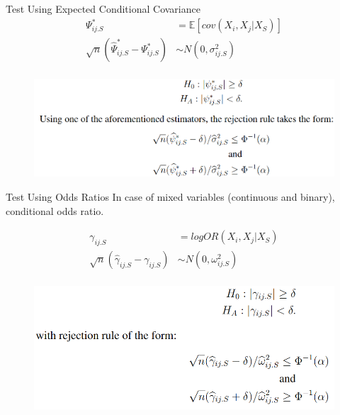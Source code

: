 \documentclass{beamer}
\begin{document}
\begin{frame}{Test Using Expected Conditional Covariance}
	\begin{equation*}
		\begin{split}
			\Psi^*_{ij.S} &= \mathbb{E}[cov(X_i, X_j | X_S)] \\
			\sqrt{n}(\hat{\Psi}^*_{ij.S} - \Psi^*_{ij.S}) & \sim N(0, \sigma^2_{ij.S}) \\
		\end{split}
	\end{equation*}
	\begin{figure}
		\centering
		\includegraphics[scale=0.3]{imgs/test2.png}
	\end{figure}
\end{frame}

\begin{frame}{Test Using Odds Ratios}
	In case of mixed variables (continuous and binary), conditional odds ratio.

	\begin{equation*}
		\begin{split}
			\gamma_{ij.S} &= log OR(X_i, X_j \rvert X_S) \\
			\sqrt{n}(\hat{\gamma}_{ij.S} - \gamma_{ij.S}) &\sim N(0, \omega^2_{ij.S}) \\
		\end{split}
	\end{equation*}
	\begin{figure}
		\centering
		\includegraphics[scale=0.3]{imgs/test3.png}
	\end{figure}
\end{frame}
\end{document}
